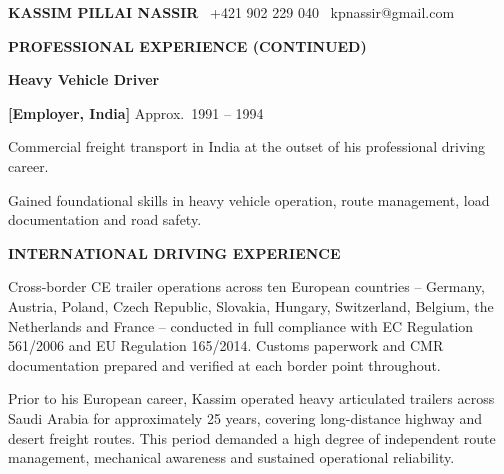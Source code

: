\documentclass[10pt,a4paper]{article}
\newcommand{\rh}[1]{%
  \vspace{9pt}%
  {\color{navy}\fontsize{7.5}{10}\selectfont\bfseries\MakeUppercase{#1}}\par
  \vspace{2pt}{\color{rulec}\hrule height 0.4pt}\par
  \vspace{6pt}%
}
\newcommand{\job}[3]{%
  \vspace{2pt}%
  {\color{navy}\fontsize{8.5}{11}\selectfont\bfseries #1}\par
  \vspace{1pt}%
  {\color{dblue}\fontsize{7.5}{9.5}\selectfont\bfseries #2}%
  \hfill
  {\color{accent}\fontsize{7}{9}\selectfont #3}\par
  \vspace{4pt}%
}
\begin{document}
\begin{minipage}[t][297mm][t]{0.682\textwidth}

\colorbox{pgray}{%
\begin{minipage}[t]{\textwidth}
\hspace{10pt}\begin{minipage}[t]{\textwidth-20pt}
\vspace{6pt}
{\color{navy}\fontsize{13}{16}\selectfont\bfseries
  KASSIM PILLAI NASSIR}%
\hfill
{\color{accent}\fontsize{7}{9}\selectfont
  \faPhone\ +421 902 229 040\quad
  \faEnvelope\ kpnassir@gmail.com}\par
\vspace{5pt}
\end{minipage}
\end{minipage}
}

\hspace{10pt}\begin{minipage}[t]{\textwidth-20pt}
\RaggedRight

\rh{Professional Experience (Continued)}

\job{Heavy Vehicle Driver}%
    {[Employer, India]}{Approx.\ 1991 -- 1994}
\begin{cvlist}
\item Commercial freight transport in India at the outset of his
  professional driving career.
\item Gained foundational skills in heavy vehicle operation,
  route management, load documentation and road safety.
\end{cvlist}

\rh{International Driving Experience}

{\fontsize{7.9}{12}\selectfont\color{body}
Cross-border CE trailer operations across ten European
countries -- Germany, Austria, Poland, Czech Republic, Slovakia,
Hungary, Switzerland, Belgium, the Netherlands and France --
conducted in full compliance with EC Regulation 561/2006 and
EU Regulation 165/2014. Customs paperwork and CMR documentation
prepared and verified at each border point throughout.\par
}

\vspace{5pt}

{\fontsize{7.9}{12}\selectfont\color{body}
Prior to his European career, Kassim operated heavy articulated
trailers across Saudi Arabia for approximately 25 years, covering
long-distance highway and desert freight routes. This period
demanded a high degree of independent route management,
mechanical awareness and sustained operational reliability.\par
}


\end{minipage}
\end{minipage}
\end{document}
